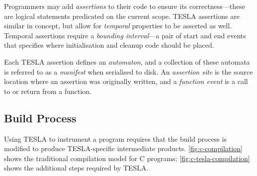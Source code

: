 Programmers may add \emph{assertions} to their code to ensure its
correctness---these are logical statements predicated on the current
scope. TESLA assertions are similar in concept, but allow for
\emph{temporal} properties to be asserted as well. Temporal assertions require a
\emph{bounding interval}---a pair of start and end events that specifies where
initialisation and cleanup code should be placed.

Each TESLA assertion defines an \emph{automaton}, and a collection of
these automata is referred to as a \emph{manifest} when serialised to
disk. An \emph{assertion site} is the source location where an assertion
was originally written, and a \emph{function event} is a call to or
return from a function.

\subsection{Build Process} \label{sec:build-tesla}

Using TESLA to instrument a program requires that the build process is
modified to produce TESLA-specific intermediate products.
\autoref{fig:c-compilation} shows the traditional compilation model for
C programs; \autoref{fig:c-tesla-compilation} shows the additional
steps required by TESLA.

